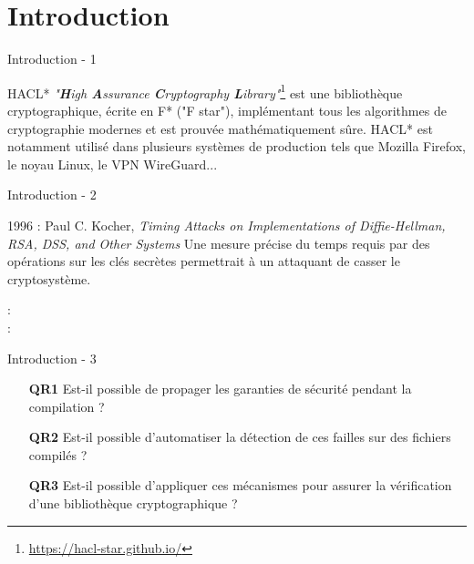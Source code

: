 \documentclass{backend/backend}
\begin{document}
\justifying

\begin{frame}
    \titlepage
\end{frame}

\section*{Introduction}
\showtoctrue %

\begin{frame}{Introduction - 1}
    \pause
    \begin{exampleblock}{HACL*}
        \textit{"\textbf{H}igh \textbf{A}ssurance \textbf{C}ryptography \textbf{L}ibrary"}\footnote{\url{https://hacl-star.github.io/}} est une bibliothèque cryptographique, écrite en F* ("F star"), implémentant tous les algorithmes de cryptographie modernes et est prouvée mathématiquement sûre. 
        \smallbreak
        HACL* est notamment utilisé dans plusieurs systèmes de production tels que Mozilla Firefox, le noyau Linux, le VPN WireGuard...
    \end{exampleblock}
\end{frame}

\begin{frame}{Introduction - 2}
    \begin{block}{1996 : Paul C. Kocher, \textit{Timing Attacks on Implementations of Diffie-Hellman, RSA, DSS, and Other Systems} }
        Une mesure précise du temps requis par des opérations sur les clés secrètes permettrait à un attaquant de casser le cryptosystème.
    \end{block}
     : \citeauthor{270176} \\
     : \citeauthor{stillPractical} 
\end{frame}


\begin{frame}{Introduction - 3}
    \begin{enumerate}
        \item[\textbf{QR1}] Est-il possible de propager les garanties de sécurité pendant la compilation ?
        \item[\textbf{QR2}] Est-il possible d'automatiser la détection de ces failles sur des fichiers compilés ?
        \item[\textbf{QR3}] Est-il possible d'appliquer ces mécanismes pour assurer la vérification d'une bibliothèque cryptographique ?
    \end{enumerate}
\end{frame}
\end{document}
